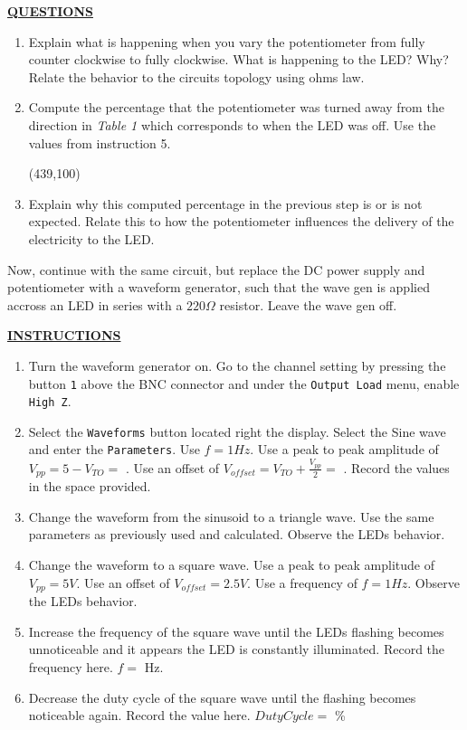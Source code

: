 \documentclass[12pt]{article}
\begin{document}
\textbf{\underline{QUESTIONS}}
\begin{enumerate}
    \item Explain what is happening when you vary the potentiometer from fully counter clockwise to fully clockwise. What is happening to the LED? Why? Relate the behavior to the circuits topology using ohms law.
        \fillwithlines{1in}

    \item Compute the percentage that the potentiometer was turned away from the direction in \textit{Table 1} which corresponds to when the LED was off. Use the values from instruction 5.
    
        \framebox(439,100){}
        
    \item Explain why this computed percentage in the previous step is or is not expected. Relate this to how the potentiometer influences the delivery of the electricity to the LED.
        \fillwithlines{1in}
\end{enumerate}         

Now, continue with the same circuit, but replace the DC power supply and potentiometer with a waveform generator, such that the wave gen is applied accross an LED in series with a $220\Omega$ resistor. Leave the wave gen off.

\textbf{\underline{INSTRUCTIONS}}
\begin{enumerate}
    \item Turn the waveform generator on. Go to the channel setting by pressing the button \texttt{1} above the BNC connector and under the \texttt{Output Load} menu, enable \texttt{High Z}.
    \item Select the \texttt{Waveforms} button located right the display. Select the Sine wave and enter the \texttt{Parameters}. Use $f = 1 Hz$. Use a peak to peak amplitude of $V_{pp} = 5 - V_{TO} = $ \underline{\hspace{2cm}}. Use an offset of $V_{offset} = V_{TO} + \frac{V_{pp}}{2} = $ \underline{\hspace{2cm}}. Record the values in the space provided.
    \item Change the waveform from the sinusoid to a triangle wave. Use the same parameters as previously used and calculated. Observe the LEDs behavior.
    \item Change the waveform to a square wave. Use a peak to peak amplitude of $V_{pp} = 5V$. Use an offset of $V_{offset} = 2.5 V$. Use a frequency of $f = 1 Hz$. Observe the LEDs behavior.
    \item Increase the frequency of the square wave until the LEDs flashing becomes unnoticeable and it appears the LED is constantly illuminated. Record the frequency here. $f = $ \underline{\hspace{2cm}} Hz.
    \item Decrease the duty cycle of the square wave until the flashing becomes noticeable again. Record the value here. $Duty Cycle = $ \underline{\hspace{2cm}} \%
\end{enumerate}
\end{document}
